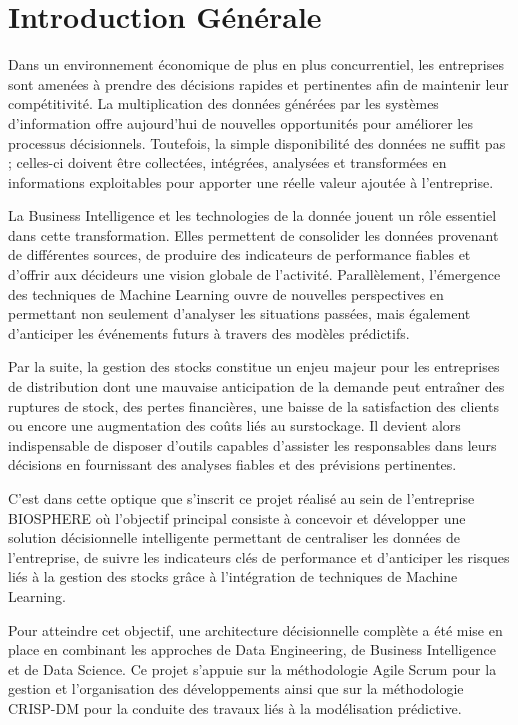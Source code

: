 \chapter*{Introduction Générale}
\mtcaddchapter %
Dans un environnement économique de plus en plus concurrentiel, les entreprises sont amenées à prendre des décisions rapides et pertinentes afin de maintenir leur compétitivité. La multiplication des données générées par les systèmes d'information offre aujourd'hui de nouvelles opportunités pour améliorer les processus décisionnels. Toutefois, la simple disponibilité des données ne suffit pas ; celles-ci doivent être collectées, intégrées, analysées et transformées en informations exploitables pour apporter une réelle valeur ajoutée à l'entreprise.

La Business Intelligence et les technologies de la donnée jouent un rôle essentiel dans cette transformation. Elles permettent de consolider les données provenant de différentes sources, de produire des indicateurs de performance fiables et d'offrir aux décideurs une vision globale de l'activité. Parallèlement, l'émergence des techniques de Machine Learning ouvre de nouvelles perspectives en permettant non seulement d'analyser les situations passées, mais également d'anticiper les événements futurs à travers des modèles prédictifs.

Par la suite, la gestion des stocks constitue un enjeu majeur pour les entreprises de distribution dont une mauvaise anticipation de la demande peut entraîner des ruptures de stock, des pertes financières, une baisse de la satisfaction des clients ou encore une augmentation des coûts liés au surstockage. Il devient alors indispensable de disposer d'outils capables d'assister les responsables dans leurs décisions en fournissant des analyses fiables et des prévisions pertinentes.

C'est dans cette optique que s'inscrit ce projet réalisé au sein de l'entreprise BIOSPHERE où l'objectif principal consiste à concevoir et développer une solution décisionnelle intelligente permettant de centraliser les données de l'entreprise, de suivre les indicateurs clés de performance et d'anticiper les risques liés à la gestion des stocks grâce à l'intégration de techniques de Machine Learning.

Pour atteindre cet objectif, une architecture décisionnelle complète a été mise en place en combinant les approches de Data Engineering, de Business Intelligence et de Data Science. Ce projet s'appuie sur la méthodologie Agile Scrum pour la gestion et l'organisation des développements ainsi que sur la méthodologie CRISP-DM pour la conduite des travaux liés à la modélisation prédictive.

